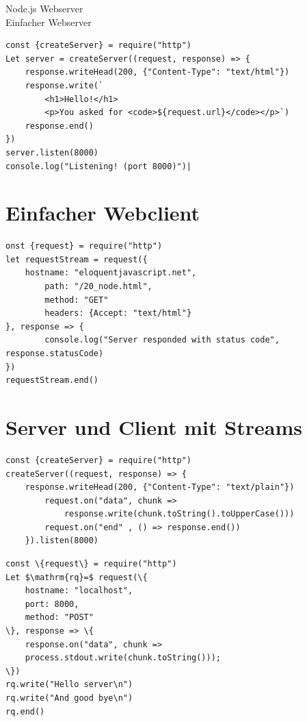 Node.js Webserver\\
Einfacher Webserver

\begin{verbatim}
const {createServer} = require("http")
Let server = createServer((request, response) => {
    response.writeHead(200, {"Content-Type": "text/html"})
    response.write(`
        <h1>Hello!</h1>
        <p>You asked for <code>${request.url}</code></p>`)
    response.end()
})
server.listen(8000)
console.log("Listening! (port 8000)")|
\end{verbatim}

\section*{Einfacher Webclient}
\begin{verbatim}
onst {request} = require("http")
let requestStream = request({
    hostname: "eloquentjavascript.net",
        path: "/20_node.html",
        method: "GET"
        headers: {Accept: "text/html"}
}, response => {
        console.log("Server responded with status code", response.statusCode)
})
requestStream.end()
\end{verbatim}

\section*{Server und Client mit Streams}
\begin{verbatim}
const {createServer} = require("http")
createServer((request, response) => {
    response.writeHead(200, {"Content-Type": "text/plain"})
        request.on("data", chunk =>
            response.write(chunk.toString().toUpperCase()))
        request.on("end" , () => response.end())
    }).listen(8000)
\end{verbatim}

\begin{verbatim}
const \{request\} = require("http")
Let $\mathrm{rq}=$ request(\{
    hostname: "localhost",
    port: 8000,
    method: "POST"
\}, response => \{
    response.on("data", chunk =>
    process.stdout.write(chunk.toString()));
\})
rq.write("Hello server\n")
rq.write("And good bye\n")
rq.end()
\end{verbatim}

